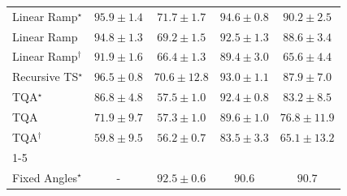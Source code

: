 \begin{tabular}{l|cccc|}
Linear Ramp$^\star$ & {\cellcolor[HTML]{732905}} \color[HTML]{F1F1F1} $95.9\pm 1.4$ & {\cellcolor[HTML]{FEB13E}} \color[HTML]{000000} $71.7\pm 1.7$ & {\cellcolor[HTML]{7E2C05}} \color[HTML]{F1F1F1} $94.6\pm 0.8$ & {\cellcolor[HTML]{A63A03}} \color[HTML]{F1F1F1} $90.2\pm 2.5$ \\
Linear Ramp & {\cellcolor[HTML]{7C2C05}} \color[HTML]{F1F1F1} $94.8\pm 1.3$ & {\cellcolor[HTML]{FEC550}} \color[HTML]{000000} $69.2\pm 1.5$ & {\cellcolor[HTML]{913204}} \color[HTML]{F1F1F1} $92.5\pm 1.3$ & {\cellcolor[HTML]{B44103}} \color[HTML]{F1F1F1} $88.6\pm 3.4$ \\
Linear Ramp$^\dagger$ & {\cellcolor[HTML]{983404}} \color[HTML]{F1F1F1} $91.9\pm 1.6$ & {\cellcolor[HTML]{FED36F}} \color[HTML]{000000} $66.4\pm 1.3$ & {\cellcolor[HTML]{AE3E03}} \color[HTML]{F1F1F1} $89.4\pm 3.0$ & {\cellcolor[HTML]{FED87A}} \color[HTML]{000000} $65.6\pm 4.4$ \\
Recursive TS$^\star$ & {\cellcolor[HTML]{6E2706}} \color[HTML]{F1F1F1} $96.5\pm 0.8$ & {\cellcolor[HTML]{FEBA46}} \color[HTML]{000000} $70.6\pm 12.8$ & {\cellcolor[HTML]{8C3004}} \color[HTML]{F1F1F1} $93.0\pm 1.1$ & {\cellcolor[HTML]{BB4403}} \color[HTML]{F1F1F1} $87.9\pm 7.0$ \\
TQA$^\star$ & {\cellcolor[HTML]{C64902}} \color[HTML]{F1F1F1} $86.8\pm 4.8$ & {\cellcolor[HTML]{FFF8C0}} \color[HTML]{000000} $57.5\pm 1.0$ & {\cellcolor[HTML]{933204}} \color[HTML]{F1F1F1} $92.4\pm 0.8$ & {\cellcolor[HTML]{DC5E0B}} \color[HTML]{F1F1F1} $83.2\pm 8.5$ \\
TQA & {\cellcolor[HTML]{FEAF3D}} \color[HTML]{000000} $71.9\pm 9.7$ & {\cellcolor[HTML]{FFF8C1}} \color[HTML]{000000} $57.3\pm 1.0$ & {\cellcolor[HTML]{AC3D03}} \color[HTML]{F1F1F1} $89.6\pm 1.0$ & {\cellcolor[HTML]{F88A21}} \color[HTML]{F1F1F1} $76.8\pm 11.9$ \\
TQA$^\dagger$ & {\cellcolor[HTML]{FFF1AE}} \color[HTML]{000000} $59.8\pm 9.5$ & {\cellcolor[HTML]{FFF9C9}} \color[HTML]{000000} $56.2\pm 0.7$ & {\cellcolor[HTML]{DA5C0A}} \color[HTML]{F1F1F1} $83.5\pm 3.3$ & {\cellcolor[HTML]{FEDB80}} \color[HTML]{000000} $65.1\pm 13.2$ \\
\cline{1-5}
\multicolumn{5}{c}{\rule{0pt}{8pt}PP} \\
\midrule
Fixed Angles$^\star$ & {\cellcolor[HTML]{000000}} \color[HTML]{F1F1F1} {\cellcolor{white}} \color{black} - & {\cellcolor[HTML]{006335}} \color[HTML]{F1F1F1} $92.5\pm 0.6$ & {\cellcolor[HTML]{076D39}} \color[HTML]{F1F1F1} $90.6$ & {\cellcolor[HTML]{076D39}} \color[HTML]{F1F1F1} $90.7$ \\

\end{tabular}
